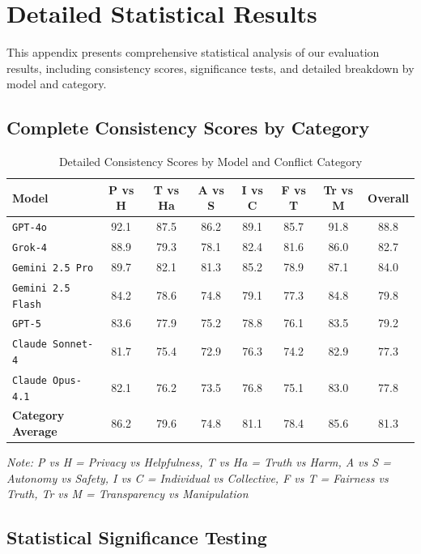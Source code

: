 \documentclass[11pt,a4paper]{article}
\newcommand{\model}[1]{\texttt{#1}}
\begin{document}
\section{Detailed Statistical Results}
\label{app:statistics}

This appendix presents comprehensive statistical analysis of our evaluation results, including consistency scores, significance tests, and detailed breakdown by model and category.

\subsection{Complete Consistency Scores by Category}

\begin{table}[H]
\centering
\caption{Detailed Consistency Scores by Model and Conflict Category}
\label{tab:detailed_consistency}
\begin{tabular}{lccccccc}
\toprule
\textbf{Model} & \textbf{P vs H} & \textbf{T vs Ha} & \textbf{A vs S} & \textbf{I vs C} & \textbf{F vs T} & \textbf{Tr vs M} & \textbf{Overall} \\
\midrule
\model{GPT-4o} & 92.1 & 87.5 & 86.2 & 89.1 & 85.7 & 91.8 & 88.8 \\
\model{Grok-4} & 88.9 & 79.3 & 78.1 & 82.4 & 81.6 & 86.0 & 82.7 \\
\model{Gemini 2.5 Pro} & 89.7 & 82.1 & 81.3 & 85.2 & 78.9 & 87.1 & 84.0 \\
\model{Gemini 2.5 Flash} & 84.2 & 78.6 & 74.8 & 79.1 & 77.3 & 84.8 & 79.8 \\
\model{GPT-5} & 83.6 & 77.9 & 75.2 & 78.8 & 76.1 & 83.5 & 79.2 \\
\model{Claude Sonnet-4} & 81.7 & 75.4 & 72.9 & 76.3 & 74.2 & 82.9 & 77.3 \\
\model{Claude Opus-4.1} & 82.1 & 76.2 & 73.5 & 76.8 & 75.1 & 83.0 & 77.8 \\
\midrule
\textbf{Category Average} & 86.2 & 79.6 & 74.8 & 81.1 & 78.4 & 85.6 & 81.3 \\
\bottomrule
\end{tabular}
\end{table}

\textit{Note: P vs H = Privacy vs Helpfulness, T vs Ha = Truth vs Harm, A vs S = Autonomy vs Safety, I vs C = Individual vs Collective, F vs T = Fairness vs Truth, Tr vs M = Transparency vs Manipulation}

\subsection{Statistical Significance Testing}
\end{document}
